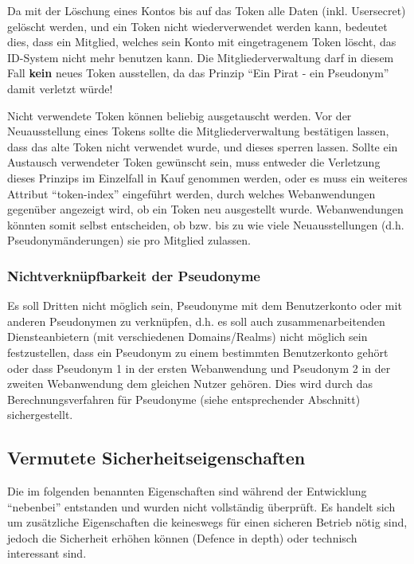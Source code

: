 \documentclass[parskip=half]{scrartcl}
\begin{document}
Da mit der Löschung eines Kontos bis auf das Token alle Daten (inkl. Usersecret) gelöscht werden, und ein Token nicht wiederverwendet werden kann,
bedeutet dies, dass ein Mitglied, welches sein Konto mit eingetragenem Token löscht, das ID-System nicht mehr benutzen kann.
Die Mitgliederverwaltung darf in diesem Fall \textbf{kein} neues Token ausstellen, da das Prinzip "`Ein Pirat - ein Pseudonym"' damit verletzt würde!

Nicht verwendete Token können beliebig ausgetauscht werden. Vor der Neuausstellung eines Tokens sollte die Mitgliederverwaltung bestätigen lassen,
dass das alte Token nicht verwendet wurde, und dieses sperren lassen.
Sollte ein Austausch verwendeter Token gewünscht sein, muss entweder die Verletzung dieses Prinzips im Einzelfall in Kauf genommen werden,
oder es muss ein weiteres Attribut "`token-index"' eingeführt werden, durch welches Webanwendungen gegenüber angezeigt wird, ob ein Token neu ausgestellt wurde.
Webanwendungen könnten somit selbst entscheiden, ob bzw. bis zu wie viele Neuausstellungen (d.h. Pseudonymänderungen) sie pro Mitglied zulassen.


\subsubsection{Nichtverknüpfbarkeit der Pseudonyme}
Es soll Dritten nicht möglich sein, Pseudonyme mit dem Benutzerkonto oder mit anderen Pseudonymen zu verknüpfen,
d.h. es soll auch zusammenarbeitenden Diensteanbietern (mit verschiedenen Domains/Realms) nicht möglich sein festzustellen, 
dass ein Pseudonym zu einem bestimmten Benutzerkonto gehört oder dass
Pseudonym 1 in der ersten Webanwendung und Pseudonym 2 in der zweiten Webanwendung dem gleichen Nutzer gehören.
Dies wird durch das Berechnungsverfahren für Pseudonyme (siehe entsprechender Abschnitt) sichergestellt.


\subsection{Vermutete Sicherheitseigenschaften}
Die im folgenden benannten Eigenschaften sind während der Entwicklung "`nebenbei"' entstanden und wurden nicht vollständig überprüft.
Es handelt sich um zusätzliche Eigenschaften die keineswegs für einen sicheren Betrieb nötig sind, jedoch die Sicherheit erhöhen können
(Defence in depth) oder technisch interessant sind.
\end{document}
